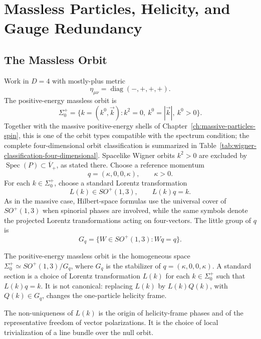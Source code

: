 \chapter{Massless Particles, Helicity, and Gauge Redundancy}
\label{ch:massless-particles-helicity-gauge-redundancy}
\ConventionsLorentzian


\section{The Massless Orbit}

Work in \(D=4\) with mostly-plus metric
\[
  \eta_{\mu\nu}=\operatorname{diag}(-,+,+,+).
\]
The positive-energy massless orbit is
\[
  \Sigma_0^+
  =
  \{k=(k^0,\vec k):k^2=0,\ k^0=|\vec k|,\ k^0>0\}.
\]
Together with the massive positive-energy shells of
Chapter~\ref{ch:massive-particles-spin}, this is one of the orbit types
compatible with the spectrum condition; the complete four-dimensional orbit
classification is summarized in
Table~\ref{tab:wigner-classification-four-dimensional}.  Spacelike Wigner
orbits \(k^2>0\) are excluded by
\(\operatorname{Spec}(P)\subset\overline V_+\), as stated there.
Choose a reference momentum
\[
  q=(\kappa,0,0,\kappa),
  \qquad
  \kappa>0.
\]
For each \(k\in\Sigma_0^+\), choose a standard Lorentz transformation
\[
  L(k)\in SO^+(1,3),
  \qquad
  L(k)q=k.
\]
As in the massive case, Hilbert-space formulas use the universal cover of
\(SO^+(1,3)\) when spinorial phases are involved, while the same symbols
denote the projected Lorentz transformations acting on four-vectors.
The little group of \(q\) is
\[
  G_q=\{W\in SO^+(1,3):Wq=q\}.
\]

\begin{definition}
\label{def:massless-orbit-standard-section}
  The positive-energy massless orbit is the homogeneous space
  \(\Sigma_0^+\simeq SO^+(1,3)/G_q\), where \(G_q\) is the stabilizer of
  \(q=(\kappa,0,0,\kappa)\).  A standard section is a choice of Lorentz
  transformation \(L(k)\) for each \(k\in\Sigma_0^+\) such that \(L(k)q=k\).
  It is not canonical: replacing \(L(k)\) by \(L(k)Q(k)\), with
  \(Q(k)\in G_q\), changes the one-particle helicity frame.
\end{definition}

The non-uniqueness of \(L(k)\) is the origin of helicity-frame phases and of
the representative freedom of vector polarizations.  It is the choice of
local trivialization of a line bundle over the null orbit.

